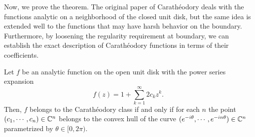 \documentclass[12pt]{article}
\begin{document}
Now, we prove the theorem.
The original paper of Carath\'eodory deals with the functions analytic on a neighborhood of the closed unit disk, but the same idea is extended well to the functions that may have harsh behavior on the boundary.
Furthermore, by loosening the regularity requirement at boundary, we can establish the exact description of Carath\'eodory functions in terms of their coefficients.

\begin{thm}
Let $f$ be an analytic function on the open unit disk with the power series expansion
\[f(z)=1+\sum_{k=1}^\infty2c_kz^k.\]
Then, $f$ belongs to the Carath\'eodory class if and only if for each $n$ the point $(c_1,\cdots,c_n)\in\mathbb{C}^n$ belongs to the convex hull of the curve $(e^{-i\theta},\cdots,e^{-in\theta})\in\mathbb{C}^n$ parametrized by $\theta\in[0,2\pi)$.
\end{thm}
\end{document}
